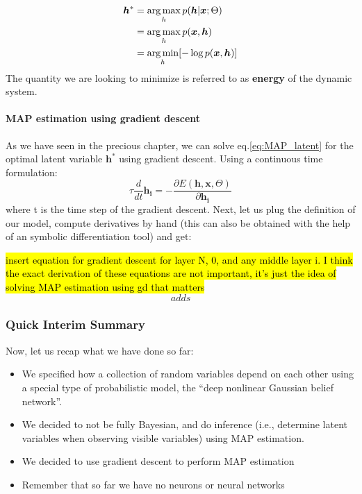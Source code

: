 \documentclass[main]{subfiles}
\begin{document}
\begin{equation}
    \begin{split}
        \bm{h}^* &= \operatorname*{arg\,max}_h p(\bm{h}|\bm{x};\Theta)\\
                &= \operatorname*{arg\,max}_h p(\bm{x},\bm{h})\\
                &= \operatorname*{arg\,min}_h [-\log p(\bm{x},\bm{h})]\\
    \end{split}
    \label{eq:MAP_latent}
\end{equation}
The quantity we are looking to minimize is referred to as \textbf{energy} of the dynamic system.

\paragraph{MAP estimation using gradient descent}
As we have seen in the precious chapter, we can solve eq.\ref{eq:MAP_latent} for the optimal latent variable $\bm{h}^*$ using gradient descent. Using a continuous time formulation:
\begin{equation}
    \tau \frac{d}{dt}\bm{h_i} = - \frac{\partial E(\bm{h},\bm{x},\Theta)}{\partial \bm{h_i}}
\end{equation}
where t is the time step of the gradient descent.
Next, let us plug the definition of our model, compute derivatives by hand (this can also be obtained with the help of an symbolic differentiation tool) and get:

\hl{insert equation for gradient descent for layer N, 0, and any middle layer i. I think the exact derivation of these equations are not important, it's just the idea of solving MAP estimation using gd that matters}
\begin{equation}
adds
\label{eq:gd_latent}
\end{equation}


\subsubsection{Quick Interim Summary}
Now, let us recap what we have done so far:
\begin{itemize}
    \item We specified how a collection of random variables depend on each other using a special type of probabilistic model, the “deep nonlinear Gaussian belief network”.
    \item We decided to not be fully Bayesian, and do inference (i.e., determine latent variables when observing visible variables) using MAP estimation.
    \item We decided to use gradient descent to perform MAP estimation
    \item Remember that so far we have no neurons or neural networks
\end{itemize}
\end{document}
